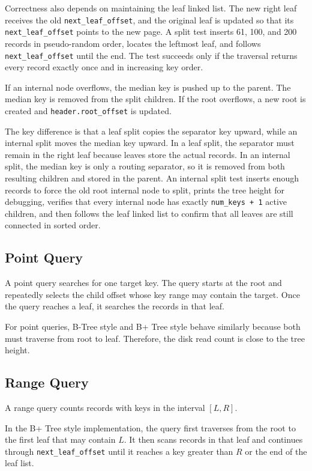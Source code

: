 \documentclass[12pt,a4paper]{article}
\begin{document}
Correctness also depends on maintaining the leaf linked list. The new right leaf receives the old \texttt{next\_leaf\_offset}, and the original leaf is updated so that its \texttt{next\_leaf\_offset} points to the new page. A split test inserts 61, 100, and 200 records in pseudo-random order, locates the leftmost leaf, and follows \texttt{next\_leaf\_offset} until the end. The test succeeds only if the traversal returns every record exactly once and in increasing key order.

If an internal node overflows, the median key is pushed up to the parent. The median key is removed from the split children. If the root overflows, a new root is created and \texttt{header.root\_offset} is updated.

The key difference is that a leaf split copies the separator key upward, while an internal split moves the median key upward. In a leaf split, the separator must remain in the right leaf because leaves store the actual records. In an internal split, the median key is only a routing separator, so it is removed from both resulting children and stored in the parent. An internal split test inserts enough records to force the old root internal node to split, prints the tree height for debugging, verifies that every internal node has exactly \texttt{num\_keys + 1} active children, and then follows the leaf linked list to confirm that all leaves are still connected in sorted order.

\subsection{Point Query}

A point query searches for one target key. The query starts at the root and repeatedly selects the child offset whose key range may contain the target. Once the query reaches a leaf, it searches the records in that leaf.

For point queries, B-Tree style and B+ Tree style behave similarly because both must traverse from root to leaf. Therefore, the disk read count is close to the tree height.

\subsection{Range Query}

A range query counts records with keys in the interval $[L, R]$.

In the B+ Tree style implementation, the query first traverses from the root to the first leaf that may contain $L$. It then scans records in that leaf and continues through \texttt{next\_leaf\_offset} until it reaches a key greater than $R$ or the end of the leaf list.
\end{document}
